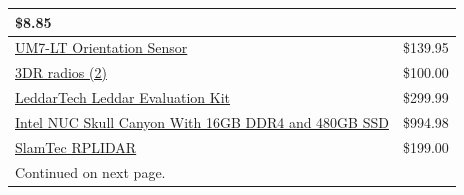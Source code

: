 \documentclass[compsoc,draftclsnofoot,onecolumn,10pt]{IEEEtran}
\begin{document}
\begin{table}[htbp]
{\begin{tabular}{ |p{3cm}|p{1cm}|  }
    {\tiny \$8.85}\\
    \hline
    {\tiny \href{http://www.chrobotics.com/shop/um7-lt-orientation-sensor}{UM7-LT Orientation Sensor}} &

    {\tiny \$139.95}\\
    \hline
    {\tiny \href{https://3dr.com/wp-content/uploads/2017/03/3DR-Radio-V2-doc1.pdf}{3DR radios (2)}} &

    {\tiny \$100.00}\\
    \hline
    {\tiny \href{http://leddartech.com/leddar-evaluation-kit/}{LeddarTech Leddar Evaluation Kit}} &

    {\tiny \$299.99}\\
    \hline
    {\tiny \href{http://www.intel.com/content/www/us/en/nuc/nuc-kit-nuc6i7kyk-features-configurations.html}{Intel NUC Skull Canyon \newline With 16GB DDR4 and 480GB SSD}}&

    {\tiny \$994.98}\\
    \hline
    {\tiny \href{https://www.slamtec.com/en/Lidar}{SlamTec RPLIDAR}} &

    {\tiny \$199.00}\\
    \hline
    {\tiny Continued on next page.} &

     \\
    \hline

    \end{tabular}}
    \end{table}

    \newpage
\end{document}
